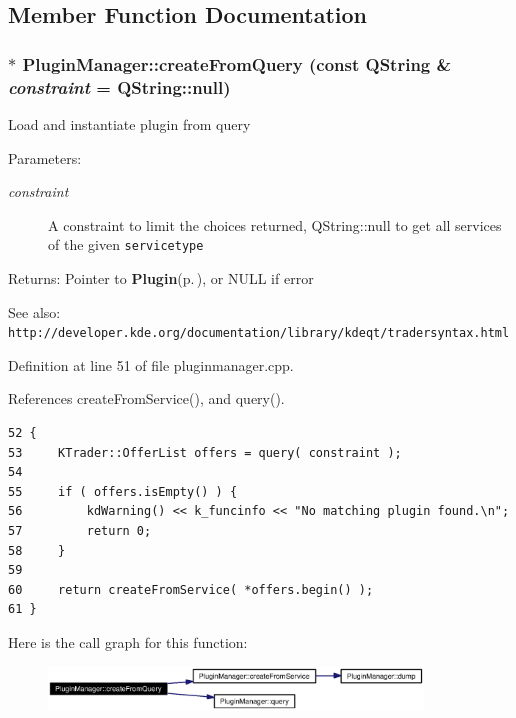 \subsection{Member Function Documentation}
\subsubsection{ $\ast$ Plugin\-Manager::create\-From\-Query (const QString \& {\em constraint} = QString::null)\hspace{0.3cm}{\tt  [static]}}\label{classPluginManager_PluginManagere1}


Load and instantiate plugin from query \begin{Desc}
\item[Parameters:]
\begin{description}
\item[{\em constraint}]A constraint to limit the choices returned, QString::null to get all services of the given {\tt servicetype} \end{description}
\end{Desc}
\begin{Desc}
\item[Returns:]Pointer to {\bf Plugin}{\rm (p.\,\pageref{classPlugin})}, or NULL if error \end{Desc}
\begin{Desc}
\item[See also:]{\tt http://developer.kde.org/documentation/library/kdeqt/tradersyntax.html} \end{Desc}


Definition at line 51 of file pluginmanager.cpp.

References create\-From\-Service(), and query().



\footnotesize\begin{verbatim}52 {
53     KTrader::OfferList offers = query( constraint );
54 
55     if ( offers.isEmpty() ) {
56         kdWarning() << k_funcinfo << "No matching plugin found.\n";                                          
57         return 0;
58     }
59                 
60     return createFromService( *offers.begin() );    
61 }
\end{verbatim}\normalsize 


Here is the call graph for this function:\begin{figure}[H]
\begin{center}
\leavevmode
\includegraphics[width=282pt]{classPluginManager_PluginManagere1_cgraph}
\end{center}
\end{figure}
